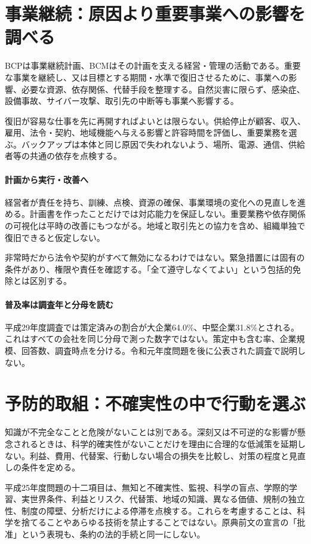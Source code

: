 \section{事業継続：原因より重要事業への影響を調べる}
\label{theory:safety:bcp}
BCPは事業継続計画、BCMはその計画を支える経営・管理の活動である。重要な事業を継続し、又は目標とする期間・水準で復旧させるために、事業への影響、必要な資源、依存関係、代替手段を整理する。自然災害に限らず、感染症、設備事故、サイバー攻撃、取引先の中断等も事業へ影響する\parencite{eth54_bcp2013,eth54_bcp2021}。

復旧が容易な仕事を先に再開すればよいとは限らない。供給停止が顧客、収入、雇用、法令・契約、地域機能へ与える影響と許容時間を評価し、重要業務を選ぶ。バックアップは本体と同じ原因で失われないよう、場所、電源、通信、供給者等の共通の依存を点検する。

\paragraph{計画から実行・改善へ}
経営者が責任を持ち、訓練、点検、資源の確保、事業環境の変化への見直しを進める。計画書を作ったことだけでは対応能力を保証しない。重要業務や依存関係の可視化は平時の改善にもつながる。地域と取引先との協力を含め、組織単独で復旧できると仮定しない。

非常時だから法令や契約がすべて無効になるわけではない。緊急措置には固有の条件があり、権限や責任を確認する。「全て遵守しなくてよい」という包括的免除とは区別する。

\paragraph{普及率は調査年と分母を読む}
平成29年度調査では策定済みの割合が大企業64.0\%、中堅企業31.8\%とされる\parencite{eth54_bcp_survey2018}。これはすべての会社を同じ分母で測った数字ではない。策定中も含む率、企業規模、回答数、調査時点を分ける。令和元年度問題を後に公表された調査で説明しない。

\section{予防的取組：不確実性の中で行動を選ぶ}
\label{theory:safety:precaution}
知識が不完全なことと危険がないことは別である。深刻又は不可逆的な影響が懸念されるときは、科学的確実性がないことだけを理由に合理的な低減策を延期しない。利益、費用、代替案、行動しない場合の損失を比較し、対策の程度と見直しの条件を定める\parencite{eth54_rio,eth54_eea}。

平成25年度問題の十二項目は、無知と不確実性、監視、科学の盲点、学際的学習、実世界条件、利益とリスク、代替策、地域の知識、異なる価値、規制の独立性、制度の障壁、分析だけによる停滞を点検する。これらを考慮することは、科学を捨てることやあらゆる技術を禁止することではない。原典前文の宣言の「批准」という表現も、条約の法的手続と同一にしない。

